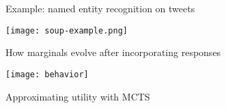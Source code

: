 \begin{block}{Example: named entity recognition on tweets}
  \begin{center}
    \texttt{[image: soup-example.png]}
  \end{center}
\end{block}
\vfill

\begin{block}{How marginals evolve after incorporating responses}
  \begin{center}
    \texttt{[image: behavior]}
  \end{center}
\end{block}
\vfill

\begin{block}{Approximating utility with MCTS}
\end{block}
\vfill

